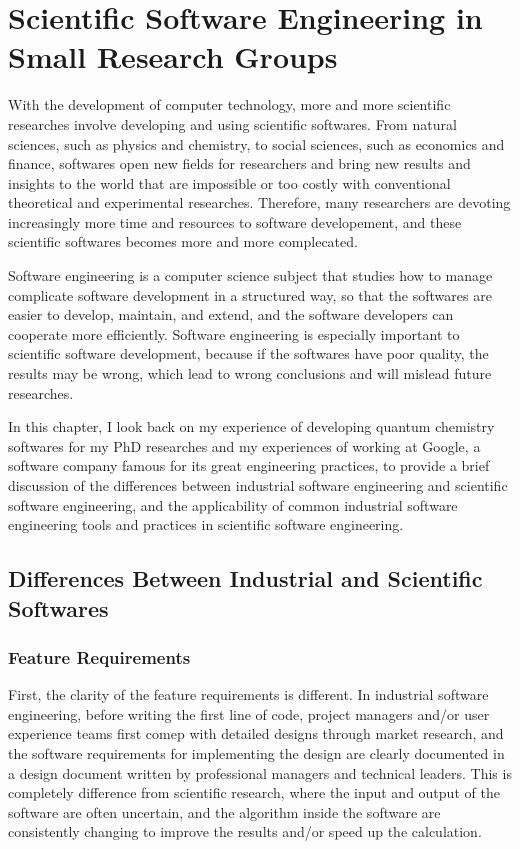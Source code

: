 \chapter{Scientific Software Engineering in Small Research Groups}

With the development of computer technology, more and more scientific researches involve developing and using scientific softwares.
From natural sciences, such as physics and chemistry, to social sciences, such as economics and finance, softwares open new fields for researchers and bring new results and insights to the world that are impossible or too costly with conventional theoretical and experimental researches.
Therefore, many researchers are devoting increasingly more time and resources to software developement, and these scientific softwares becomes more and more complecated.

Software engineering is a computer science subject that studies how to manage complicate software development in a structured way, so that the softwares are easier to develop, maintain, and extend, and the software developers can cooperate more efficiently.
Software engineering is especially important to scientific software development, because if the softwares have poor quality, the results may be wrong, which lead to wrong conclusions and will mislead future researches.

In this chapter, I look back on my experience of developing quantum chemistry softwares for my PhD researches and my experiences of working at Google, a software company famous for its great engineering practices, to provide a brief discussion of the differences between industrial software engineering and scientific software engineering, and the applicability of common industrial software engineering tools and practices in scientific software engineering.

\section{Differences Between Industrial and Scientific Softwares}
\subsection{Feature Requirements}
First, the clarity of the feature requirements is different.
In industrial software engineering, before writing the first line of code, project managers and/or user experience teams first comep with detailed designs through market research, and the software requirements for implementing the design are clearly documented in a design document written by professional managers and technical leaders.
This is completely difference from scientific research, where the input and output of the software are often uncertain, and the algorithm inside the software are consistently changing to improve the results and/or speed up the calculation.


